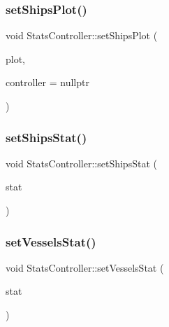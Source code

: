 \mbox{\label{class_stats_controller_a9deaf4dfc3277893d7870e0499e94b69}} 
\subsubsection{\texorpdfstring{setShipsPlot()}{setShipsPlot()}}
{\footnotesize\ttfamily void Stats\+Controller\+::set\+Ships\+Plot (\begin{DoxyParamCaption}\item[{\mbox{\hyperlink{class_plot_widget}{Plot\+Widget}} $\ast$}]{plot,  }\item[{\mbox{\hyperlink{class_graph_interaction_controller}{Graph\+Interaction\+Controller}} $\ast$}]{controller = {\ttfamily nullptr} }\end{DoxyParamCaption})}

\mbox{\label{class_stats_controller_a477bc8d01f5be49dfea6da50ecc084bb}} 
\subsubsection{\texorpdfstring{setShipsStat()}{setShipsStat()}}
{\footnotesize\ttfamily void Stats\+Controller\+::set\+Ships\+Stat (\begin{DoxyParamCaption}\item[{\mbox{\hyperlink{namespacedisplace_1_1plot_a8c50b4d54cafba744b1b5b51b53407e0}{displace\+::plot\+::\+Ships\+Stat}}}]{stat }\end{DoxyParamCaption})}

\mbox{\label{class_stats_controller_a914a8f1afeba5b329355a6708d4d5863}} 
\subsubsection{\texorpdfstring{setVesselsStat()}{setVesselsStat()}}
{\footnotesize\ttfamily void Stats\+Controller\+::set\+Vessels\+Stat (\begin{DoxyParamCaption}\item[{\mbox{\hyperlink{namespacedisplace_1_1plot_aa453098d286017edd5b0ff3f15ba1013}{displace\+::plot\+::\+Vessels\+Stat}}}]{stat }\end{DoxyParamCaption})}


